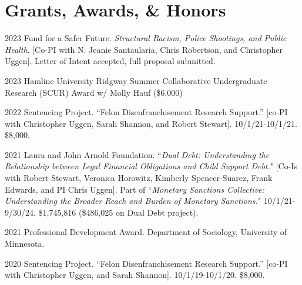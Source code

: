 \documentclass[letterpaper]{article}
\renewenvironment{itemize}{
  \begin{list}{}{
    \setlength{\leftmargin}{1.5em}
  }
}{
  \end{list}
}
\begin{document}
\begin{itemize}




\end{itemize}

\section*{\textbf{Grants, Awards, \& Honors}}

\begin{itemize}

\item 2023 Fund for a Safer Future. \textit{Structural Racism, Police Shootings, and Public Health}. [Co-PI with N. Jeanie Santaularia, Chris Robertson, and Christopher Uggen]. Letter of Intent accepted, full proposal submitted. 

\item 2023 Hamline University Ridgway Summer Collaborative Undergraduate Research (SCUR) Award w/ Molly Hauf (\$6,000)
\item 2022 Sentencing Project. “Felon Disenfranchisement Research Support.” [co-PI with Christopher Uggen, Sarah Shannon, and Robert Stewart]. 10/1/21-10/1/21. \$8,000.
\item 2021  Laura and John Arnold Foundation. ``\textit{Dual Debt: Understanding the Relationship between Legal Financial Obligations and Child Support Debt.}" [Co-Is with Robert Stewart, Veronica Horowitz, Kimberly Spencer-Suarez, Frank Edwards, and PI Chris Uggen]. Part of ``\textit{Monetary Sanctions Collective: Understanding the Broader Reach and Burden of Monetary Sanctions.}" 10/1/21-9/30/24. \$1,745,816 (\$486,025 on Dual Debt project).
\item 2021 Professional Development Award. Department of Sociology, University of Minnesota. 
\item 2020 Sentencing Project. “Felon Disenfranchisement Research Support.” [co-PI with Christopher Uggen, and Sarah Shannon]. 10/1/19-10/1/20. \$8,000.


\end{itemize}
\end{document}
